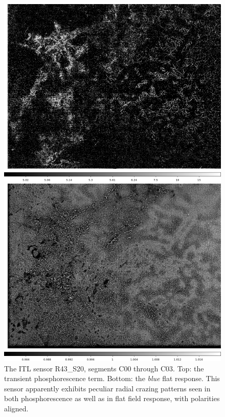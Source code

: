 \begin{figure}[!htbp]
\centering
\begin{minipage}{1.0\textwidth}    
  \centering
  \includegraphics[width=.6\linewidth]{figures/phosphorescence-survey/stains_phos_R43_S20_detail.png}    
\end{minipage}
\begin{minipage}{1.0\textwidth}
  \centering
  \includegraphics[width=.6\linewidth]{figures/phosphorescence-survey/stains_abs_R43_S20_detail.png}
\end{minipage}
\caption{The ITL sensor R43\_S20, segments C00 through C03. Top: the transient phosphorescence term. Bottom: the {\it blue} flat response. This sensor apparently exhibits peculiar radial crazing patterns seen in both phosphorescence as well as in flat field response, with polarities aligned.}
\label{fig:phos:stains:R43S20}
\end{figure}

